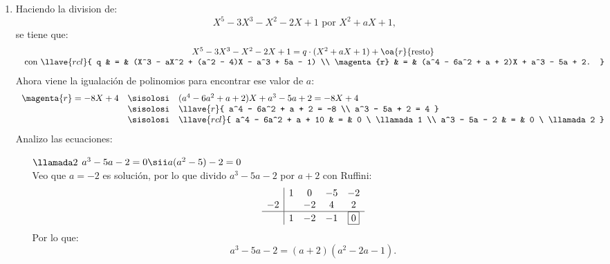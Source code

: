 \begin{enumerate}[label=\roman*)]
  \item Haciendo la division de:
        $$
          X^5 - 3X^3 - X^2 - 2X + 1 \text{ por } X^2 + aX + 1,
        $$
        se tiene que:
        $$
          \begin{array}{c}
            X^5 - 3X^3 - X^2 - 2X + 1 = q \cdot (X^2 + aX + 1) + \oa{r}{\text{resto}} \\
            \text{ con }
            \llave{rcl}{
            q           & = & (X^3 - aX^2 + (a^2 - 4)X - a^3 + 5a - 1)                \\
            \magenta{r} & = & (a^4 - 6a^2 + a + 2)X + a^3 - 5a + 2.
            }
          \end{array}
        $$
        Ahora viene la igualación de polinomios para encontrar ese valor de $a$:
        $$
          \begin{array}{rcl}
            \magenta{r} = -8X + 4
                                & \sisolosi &
            (a^4 - 6a^2 + a + 2)X + a^3 - 5a + 2 = -8X + 4          \\
                                & \sisolosi &
            \llave{r}{
            a^4 - 6a^2 + a + 2 = -8                                 \\
              a^3 - 5a + 2 = 4
            }                                                       \\
                                & \sisolosi &
            \llave{rcl}{
            a^4 - 6a^2 + a + 10 & =         & 0        \  \llamada1 \\
            a^3 - 5a - 2        & =         & 0 \  \llamada2
            }
          \end{array}
        $$
        Analizo las ecuaciones:
        \begin{itemize}
          \item[$\llamada2$] $a^3 - 5a - 2 = 0 \sii a(a^2 - 5) - 2 = 0$\\
                Veo que $a = -2$ es solución, por lo que divido $a^3 - 5a - 2$ por $a + 2$ con Ruffini:
                $$
                  \begin{array}{c|cccc}
                       & 1 & 0  & -5 & -2        \\
                    -2 &   & -2 & 4  & 2         \\
                    \hline
                       & 1 & -2 & -1 & \boxed{0}
                  \end{array}
                $$
                Por lo que:
                $$
                  a^3 - 5a - 2 = (a + 2)(a^2 - 2a - 1).
$$
\end{itemize}
\end{enumerate}
